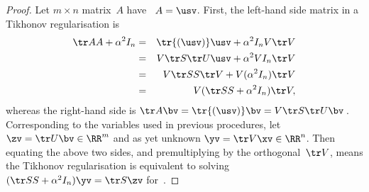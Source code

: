 \begin{proof} 
Let \(m\times n\) matrix~\(A\) have \svd\ \(A=\usv\).
First, the left-hand side matrix in a Tikhonov regularisation is
\begin{eqnarray*}
\tr AA+\alpha^2I_n
&=&\tr{(\usv)}\usv+\alpha^2I_nV\tr V
\\&=&V\tr S\tr U\usv+\alpha^2VI_n\tr V
\\&=&V\tr SS\tr V+V(\alpha^2I_n)\tr V
\\&=&V(\tr SS+\alpha^2I_n)\tr V,
\end{eqnarray*}
whereas the right-hand side is \(\tr A\bv =\tr{(\usv)}\bv =V\tr S\tr U\bv\)\,.
Corresponding to the variables used in previous procedures, let \(\zv=\tr U\bv\in\RR^m\) and as yet unknown \(\yv=\tr V\xv\in\RR^n\). 
Then equating the above two sides, and premultiplying by the orthogonal~\(\tr V\), means the Tikhonov regularisation is equivalent to solving \((\tr SS+\alpha^2I_n)\yv=\tr S\zv\) for~\yv.


\end{proof}
